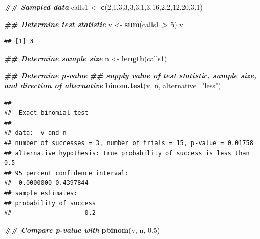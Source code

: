 \documentclass[
]{book}
\newenvironment{Shaded}{\begin{snugshade}}{\end{snugshade}}
\newcommand{\AttributeTok}[1]{\textcolor[rgb]{0.13,0.29,0.53}{#1}}
\newcommand{\DecValTok}[1]{\textcolor[rgb]{0.00,0.00,0.81}{#1}}
\newcommand{\DocumentationTok}[1]{\textcolor[rgb]{0.56,0.35,0.01}{\textbf{\textit{#1}}}}
\newcommand{\FloatTok}[1]{\textcolor[rgb]{0.00,0.00,0.81}{#1}}
\newcommand{\FunctionTok}[1]{\textcolor[rgb]{0.13,0.29,0.53}{\textbf{#1}}}
\newcommand{\NormalTok}[1]{#1}
\newcommand{\OtherTok}[1]{\textcolor[rgb]{0.56,0.35,0.01}{#1}}
\newcommand{\SpecialCharTok}[1]{\textcolor[rgb]{0.81,0.36,0.00}{\textbf{#1}}}
\newcommand{\StringTok}[1]{\textcolor[rgb]{0.31,0.60,0.02}{#1}}
\theoremstyle{definition}
\theoremstyle{definition}
\theoremstyle{definition}
\theoremstyle{definition}
\theoremstyle{remark}
\begin{document}
\begin{Shaded}
\begin{Highlighting}[]
\DocumentationTok{\#\# Sampled data}
\NormalTok{calls1 }\OtherTok{\textless{}{-}} \FunctionTok{c}\NormalTok{(}\DecValTok{2}\NormalTok{,}\DecValTok{1}\NormalTok{,}\DecValTok{3}\NormalTok{,}\DecValTok{3}\NormalTok{,}\DecValTok{3}\NormalTok{,}\DecValTok{3}\NormalTok{,}\DecValTok{1}\NormalTok{,}\DecValTok{3}\NormalTok{,}\DecValTok{16}\NormalTok{,}\DecValTok{2}\NormalTok{,}\DecValTok{2}\NormalTok{,}\DecValTok{12}\NormalTok{,}\DecValTok{20}\NormalTok{,}\DecValTok{3}\NormalTok{,}\DecValTok{1}\NormalTok{)}

\DocumentationTok{\#\# Determine test statistic}
\NormalTok{v }\OtherTok{\textless{}{-}} \FunctionTok{sum}\NormalTok{(calls1 }\SpecialCharTok{\textgreater{}} \DecValTok{5}\NormalTok{)}
\NormalTok{v}
\end{Highlighting}
\end{Shaded}

\begin{verbatim}
## [1] 3
\end{verbatim}

\begin{Shaded}
\begin{Highlighting}[]
\DocumentationTok{\#\# Determine sample size}
\NormalTok{n }\OtherTok{\textless{}{-}} \FunctionTok{length}\NormalTok{(calls1)}

\DocumentationTok{\#\# Determine p{-}value}
\DocumentationTok{\#\# supply value of test statistic, sample size, and direction of alternative}
\FunctionTok{binom.test}\NormalTok{(v, n, }\AttributeTok{alternative=}\StringTok{"less"}\NormalTok{)}
\end{Highlighting}
\end{Shaded}

\begin{verbatim}
## 
##  Exact binomial test
## 
## data:  v and n
## number of successes = 3, number of trials = 15, p-value = 0.01758
## alternative hypothesis: true probability of success is less than 0.5
## 95 percent confidence interval:
##  0.0000000 0.4397844
## sample estimates:
## probability of success 
##                    0.2
\end{verbatim}

\begin{Shaded}
\begin{Highlighting}[]
\DocumentationTok{\#\# Compare p{-}value with}
\FunctionTok{pbinom}\NormalTok{(v, n, }\FloatTok{0.5}\NormalTok{)}
\end{Highlighting}
\end{Shaded}
\end{document}
